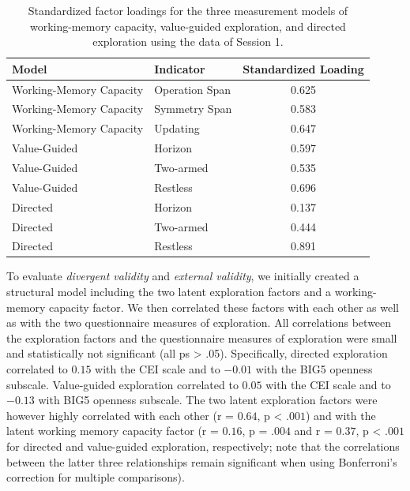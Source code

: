 \documentclass[fleqn,10pt]{wlscirep}
\begin{document}
\begin{table}[h!]
\centering
\begin{tabular}{llc}
\toprule
\textbf{Model} & \textbf{Indicator} & \textbf{Standardized Loading} \\
\midrule
Working-Memory Capacity & Operation Span & 0.625 \\
Working-Memory Capacity & Symmetry Span & 0.583 \\
Working-Memory Capacity & Updating & 0.647 \\
\midrule
Value-Guided & Horizon & 0.597 \\
Value-Guided & Two-armed & 0.535 \\
Value-Guided & Restless & 0.696 \\
\midrule
Directed & Horizon & 0.137 \\
Directed & Two-armed & 0.444 \\
Directed & Restless & 0.891 \\
\bottomrule
\end{tabular}
\captionsetup{justification=centering, width=\textwidth}
\caption{Standardized factor loadings for the three measurement models of working-memory capacity, value-guided exploration, and directed exploration using the data of Session 1.}
\label{tab:mm-factor-loadings}
\end{table}


To evaluate \textit{divergent validity} and \textit{external validity}, we initially created a structural model including the two latent exploration factors and a working-memory capacity factor. We then correlated these factors with each other as well as with the two questionnaire measures of exploration. All correlations between the  exploration factors and the questionnaire measures of exploration were small and statistically not significant (all ps > .05). Specifically, directed exploration correlated to $0.15$ with the CEI scale and to $-0.01$ with the BIG5 openness subscale. Value-guided exploration correlated to $0.05$ with the CEI scale and to $-0.13$ with BIG5 openness subscale. The two latent exploration factors were however highly correlated with each other (r = $0.64$, p < $.001$) and with the latent working memory capacity factor (r = $0.16$, p = $.004$ and r = $0.37$, p < $.001$ for directed and value-guided exploration, respectively; note that the correlations between the latter three relationships remain significant when using Bonferroni's correction for multiple comparisons). 
\end{document}
